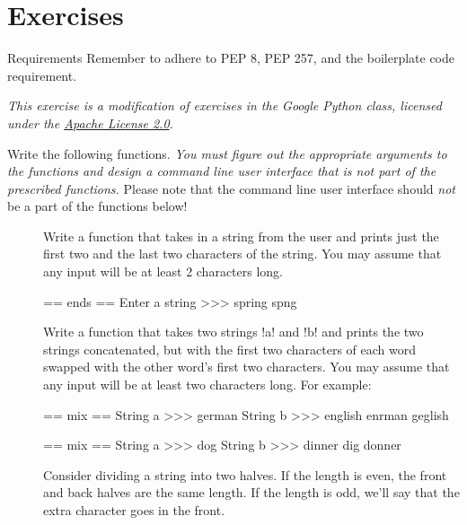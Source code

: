 \documentclass[11pt]{cselabheader}
\begin{document}
\pagebreak
\section{Exercises}
\label{sec:ex}

\begin{warningbox}{Requirements}
  Remember to adhere to PEP 8, PEP 257, and the boilerplate code requirement.
\end{warningbox}

\begin{ex}[stringfun.py]
\emph{This exercise is a modification of exercises in the Google Python
  class, licensed under the
  \href{http://www.apache.org/licenses/LICENSE-2.0.html}{Apache License 2.0}.}

Write the following functions. \emph{You must figure out the appropriate
  arguments to the functions and design a command line user interface that is
not part of the prescribed functions.} Please note that the command line user
interface should \emph{not} be a part of the functions below!

\begin{description}
  \item[]
  Write a function that takes in a string from the user and
  prints just the first two and the last two characters of the string.
  You may assume that any input will be at least 2 characters long.

  \begin{verbatimcode}
== ends ==
Enter a string >>> spring
spng
  \end{verbatimcode}

  \item[]
Write a function that takes two strings \pythoninline!a! and
  \pythoninline!b! and prints the two strings concatenated, but with the first
  two characters of each word swapped with the other word's first two
  characters. You may assume that any input will be at least two characters
  long.
  For example:

  \begin{verbatimcode}
== mix ==
String a >>> german
String b >>> english
enrman geglish
  \end{verbatimcode}

  \begin{verbatimcode}
== mix ==
String a >>> dog
String b >>> dinner
dig donner
  \end{verbatimcode}

  \item[]
Consider dividing a string into two halves. If the length
  is even, the front and back halves are the same length. If the length is odd,
  we'll say that the extra character goes in the front. 


\end{description}
\end{ex}
\end{document}
